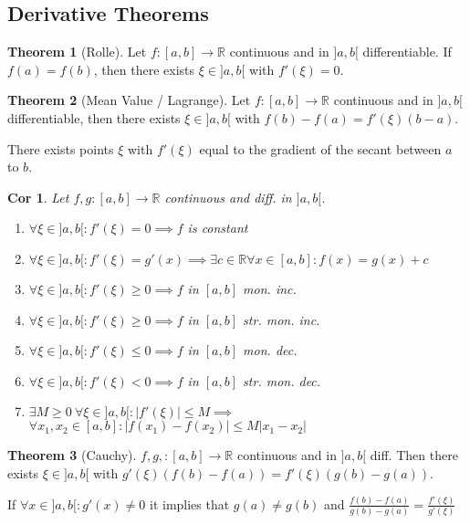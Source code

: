 \documentclass[a4paper, 10pt]{article}
\newtheorem*{corollary}{Cor}
\theoremstyle{definition}
\theoremstyle{named}
\newtheorem*{ntheorem_wrapper}{Theorem}
\newenvironment{ntheorem}%
    {\begin{mdframed}[style=important]\begin{ntheorem_wrapper}}%
    {\end{ntheorem_wrapper}\end{mdframed}}
\newcommand{\R}{\mathbb{R}}
\begin{document}
\subsection{Derivative Theorems}
\begin{ntheorem}[Rolle]
    Let $f: [a, b] \to \R$ continuous and in $]a, b[$ differentiable. If $f(a) = f(b)$, then there exists $\xi \in ]a, b[$ with $f'(\xi) = 0$.
\end{ntheorem}

\begin{ntheorem}[Mean Value / Lagrange]
    Let $f: [a, b] \to \R$ continuous and in $]a, b[$ differentiable, then there exists $\xi \in ]a, b[$ with $f(b) - f(a) = f'(\xi)(b-a)$.

    There exists points $\xi$ with $f'(\xi)$ equal to the gradient of the secant between $a$ to $b$.
\end{ntheorem}

\begin{corollary}
    Let $f, g: [a, b] \to \R$ continuous and diff. in $]a, b[$.
    \begin{enumerate}
        \item $\forall \xi \in ]a, b[: f'(\xi) = 0 \implies f$ is constant
        \item $\forall \xi \in ]a, b[: f'(\xi) = g'(x) \implies \exists c \in \R \forall x \in [a, b] : f(x) = g(x) + c$
        \item $\forall \xi \in ]a, b[: f'(\xi) \geq 0 \implies f$ in $[a, b]$ mon. inc.
        \item $\forall \xi \in ]a, b[: f'(\xi) \geq 0 \implies f$ in $[a, b]$ str. mon. inc.
        \item $\forall \xi \in ]a, b[: f'(\xi) \leq 0 \implies f$ in $[a, b]$ mon. dec.
        \item $\forall \xi \in ]a, b[: f'(\xi) < 0 \implies f$ in $[a, b]$ str. mon. dec.
        \item $\exists M \geq 0 \ \forall \xi \in ]a, b[ : |f'(\xi)| \leq M \implies$ \newline $\forall x_1, x_2 \in [a, b]: |f(x_1) - f(x_2)| \leq M |x_1 - x_2|$
    \end{enumerate}
\end{corollary}

\begin{ntheorem}[Cauchy]
    $f, g,: [a, b] \to \R$ continuous and in $]a, b[$ diff. Then there exists $\xi \in ]a, b[$ with $g'(\xi)(f(b) - f(a)) = f'(\xi)(g(b) - g(a))$.

    If $\forall x \in ]a, b[ : g'(x) \neq 0$ it implies that $g(a) \neq g(b)$ and $\frac{f(b) - f(a)}{g(b) - g(a)} = \frac{f'(\xi)}{g'(\xi)}$
\end{ntheorem}
\end{document}
